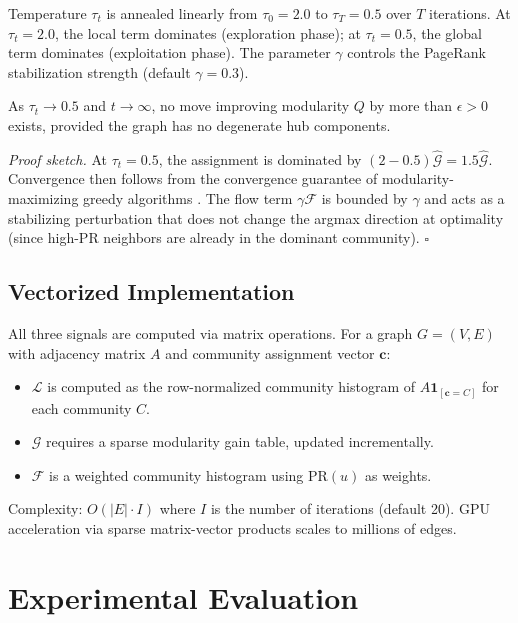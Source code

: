 \documentclass[10pt,twocolumn]{article}
\begin{document}
Temperature $\tau_t$ is annealed linearly from $\tau_0 = 2.0$ to $\tau_T = 0.5$ over
$T$ iterations. At $\tau_t = 2.0$, the local term dominates (exploration phase); at
$\tau_t = 0.5$, the global term dominates (exploitation phase). The parameter $\gamma$
controls the PageRank stabilization strength (default $\gamma = 0.3$).

\begin{proposition}[Convergence]
\label{prop:convergence}
As $\tau_t \to 0.5$ and $t \to \infty$, no move improving modularity $Q$ by more than
$\epsilon > 0$ exists, provided the graph has no degenerate hub components.
\end{proposition}

\textit{Proof sketch.} At $\tau_t = 0.5$, the assignment is dominated by
$(2-0.5)\widehat{\mathcal{G}} = 1.5\widehat{\mathcal{G}}$. Convergence then follows from
the convergence guarantee of modularity-maximizing greedy algorithms
\cite{blondel2008louvain}. The flow term $\gamma\mathcal{F}$ is bounded by $\gamma$ and acts as a
stabilizing perturbation that does not change the argmax direction at optimality
(since high-PR neighbors are already in the dominant community). $\square$

\subsection{Vectorized Implementation}

All three signals are computed via matrix operations. For a graph $G = (V, E)$ with
adjacency matrix $A$ and community assignment vector $\mathbf{c}$:

\begin{itemize}
  \item $\mathcal{L}$ is computed as the row-normalized community histogram of
        $A\mathbf{1}_{[\mathbf{c}=C]}$ for each community $C$.
  \item $\mathcal{G}$ requires a sparse modularity gain table, updated incrementally.
  \item $\mathcal{F}$ is a weighted community histogram using $\mathrm{PR}(u)$ as weights.
\end{itemize}

Complexity: $O(|E| \cdot I)$ where $I$ is the number of iterations (default 20).
GPU acceleration via sparse matrix-vector products scales to millions of edges.

\section{Experimental Evaluation}
\label{sec:experiments}
\end{document}
